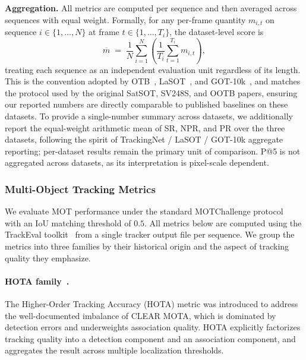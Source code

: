 \documentclass{article}
\begin{document}
\noindent\textbf{Aggregation.} All metrics are computed per sequence and then
averaged across sequences with equal weight. Formally, for any per-frame
quantity $m_{i,t}$ on sequence $i \in \{1,\dots,N\}$ at frame $t \in
\{1,\dots,T_i\}$, the dataset-level score is
\begin{equation}
\overline{m} \;=\; \frac{1}{N} \sum_{i=1}^{N} \left( \frac{1}{T_i} \sum_{t=1}^{T_i} m_{i,t} \right),
\end{equation}
treating each sequence as an independent evaluation unit regardless of its
length. This is the convention adopted by OTB~\citep{wu2015otb},
LaSOT~\citep{fan2019lasot}, and GOT-10k~\citep{huang2021got10k}, and matches the
protocol used by the original SatSOT, SV248S, and OOTB papers, ensuring our
reported numbers are directly comparable to published baselines on these
datasets. To provide a single-number summary across datasets, we additionally
report the equal-weight arithmetic mean of SR, NPR, and PR over the three
datasets, following the spirit of TrackingNet / LaSOT / GOT-10k aggregate
reporting; per-dataset results remain the primary unit of comparison. P@5 is not
aggregated across datasets, as its interpretation is pixel-scale dependent.

\subsubsection{Multi-Object Tracking Metrics}
\label{app:mot_metrics}

We evaluate MOT performance under the standard MOTChallenge
protocol~\citep{milan2016mot16} with an IoU matching threshold of $0.5$.
All metrics below are computed using the TrackEval
toolkit~\citep{luiten2020trackeval} from a single tracker output file per
sequence. We group the metrics into three families by their historical
origin and the aspect of tracking quality they emphasize.

\paragraph{HOTA family~\citep{luiten2021hota}.}
The Higher-Order Tracking Accuracy (HOTA) metric was introduced to
address the well-documented imbalance of CLEAR MOTA, which is dominated
by detection errors and underweights association quality. HOTA explicitly
factorizes tracking quality into a detection component and an association
component, and aggregates the result across multiple localization
thresholds.
\end{document}
